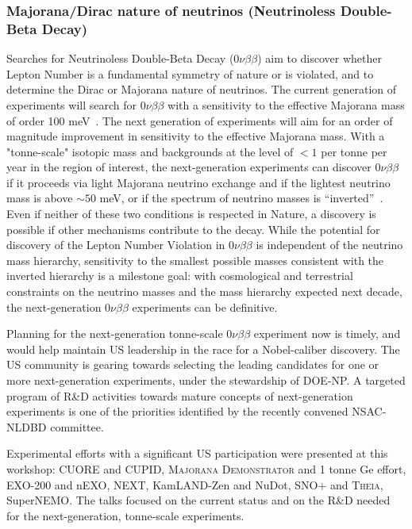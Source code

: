 \subsubsection{Majorana/Dirac nature of neutrinos (Neutrinoless
  Double-Beta Decay)}

Searches for Neutrinoless Double-Beta Decay ($0\nu\beta\beta$) aim to
discover whether Lepton Number is a fundamental symmetry of nature or
is violated, and to determine the Dirac or Majorana nature of
neutrinos. The current generation of experiments will search for
$0\nu\beta\beta$ with a sensitivity to the effective Majorana mass of
order 100 meV~\cite{deGouvea:2013onf}. The next generation of
experiments will aim for an order of magnitude improvement in
sensitivity to the effective Majorana mass. With a "tonne-scale"
isotopic mass and backgrounds at the level of $<1$ per tonne per year
in the region of interest, the next-generation experiments can
discover $0\nu\beta\beta$ if it proceeds via light Majorana neutrino
exchange and if the lightest neutrino mass is above $\sim50$ meV, or
if the spectrum of neutrino masses is
``inverted''~\cite{Bahcall:2004ip}.  Even if neither of these two
conditions is respected in Nature, a discovery is possible if other
mechanisms contribute to the decay. While the potential for discovery
of the Lepton Number Violation in $0\nu\beta\beta$ is independent of
the neutrino mass hierarchy, sensitivity to the smallest possible
masses consistent with the inverted hierarchy is a milestone goal:
with cosmological and terrestrial constraints on the neutrino masses
and the mass hierarchy expected next decade, the next-generation
$0\nu\beta\beta$ experiments can be definitive.

Planning for the next-generation tonne-scale $0\nu\beta\beta$
experiment now is timely, and would help maintain US leadership in the
race for a Nobel-caliber discovery. The US community is gearing
towards selecting the leading candidates for one or more
next-generation experiments, under the stewardship of DOE-NP.  A
targeted program of R\&D activities towards mature concepts of
next-generation experiments is one of the priorities identified by the
recently convened NSAC-NLDBD committee.

Experimental efforts with a significant US participation were
presented at this workshop: CUORE and CUPID, \textsc{Majorana
  Demonstrator\/} and 1 tonne Ge effort, EXO-200 and nEXO, NEXT,
KamLAND-Zen and NuDot, SNO+ and \textsc{Theia}, SuperNEMO. The talks
focused on the current status and on the R\&D needed for the
next-generation, tonne-scale experiments.

